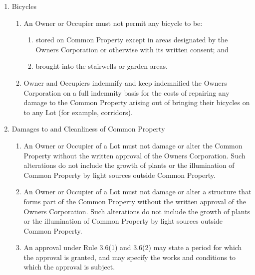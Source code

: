 \documentclass{article}
\begin{document}
\begin{enumerate}[label=\arabic*.]
\begin{enumerate}[label=\arabic{enumi}.\arabic*.]
\begin{enumerate}[label=(\arabic*)]
\end{enumerate}

\item  Bicycles

\begin{enumerate}[label=(\arabic*)]

\item  An Owner or Occupier must not permit any bicycle to be:

\begin{enumerate}[label=(\alph*)]

\item  stored on Common Property except in areas designated by the Owners Corporation or otherwise with its written consent; and

\item  brought into the stairwells or garden areas.

\end{enumerate}

\item  Owner and Occupiers indemnify and keep indemnified the Owners Corporation on a full indemnity basis for the costs of repairing any damage to the Common Property arising out of bringing their bicycles on to any Lot (for example, corridors).

\end{enumerate}

\item  Damages to and Cleanliness of Common Property

\begin{enumerate}[label=(\arabic*)]

\item  An Owner or Occupier of a Lot must not damage or alter the Common Property without the written approval of the Owners Corporation. Such alterations do not include the growth of plants or the illumination of Common Property by light sources outside Common Property.

\item  An Owner or Occupier of a Lot must not damage or alter a structure that forms part of the Common Property without the written approval of the Owners Corporation. Such alterations do not include the growth of plants or the illumination of Common Property by light sources outside Common Property.

\item  An approval under Rule 3.6(1) and 3.6(2) may state a period for which the approval is granted, and may specify the works and conditions to which the approval is subject.


\end{enumerate}
\end{enumerate}
\end{enumerate}
\end{document}
